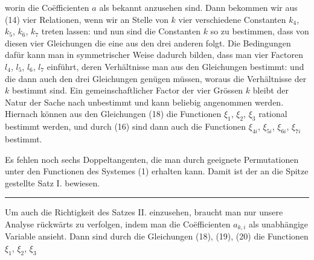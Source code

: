 worin die Co\"efficienten $a$ als bekannt anzusehen sind. Dann bekommen wir aus (14) vier Relationen, wenn wir an Stelle von $k$ vier verschiedene Constanten $k_4$, $k_5$, $k_6$, $k_7$ treten lassen:
und nun sind die Constanten $k$ so zu bestimmen, dass von diesen vier Gleichungen die eine aus den drei anderen folgt. Die Bedingungen dafür kann man in symmetrischer Weise dadurch bilden, dass man vier Factoren $l_4$, $l_5$, $l_6$, $l_7$ einführt, deren Verhältnisse man aus den Gleichungen bestimmt:
und die dann auch den drei Gleichungen
genügen müssen, woraus die Verhältnisse der $k$ bestimmt sind. Ein gemeinschaftlicher Factor der vier Grössen $k$ bleibt der Natur der Sache nach unbestimmt und kann beliebig angenommen werden. Hiernach können aus den Gleichungen (18) die Functionen $\xi_1$, $\xi_2$, $\xi_3$ rational bestimmt werden, und durch (16) sind dann auch die Functionen $\xi_{4i}$, $\xi_{5i}$, $\xi_{6i}$, $\xi_{7i}$ bestimmt.

Es fehlen noch sechs Doppeltangenten, die man durch geeignete Permutationen unter den Functionen des Systemes (1) erhalten kann. Damit ist der an die Spitze gestellte Satz I. bewiesen.

\par\noindent\rule{0.3\textwidth}{0.4pt}\par

Um auch die Richtigkeit des Satzes II. einzusehen, braucht man nur unsere Analyse rückwärts zu verfolgen, indem man die Co\"efficienten $a_{k,i}$ als unabhängige Variable ansieht. Dann sind durch die Gleichungen (18), (19), (20) die Functionen $\xi_1$, $\xi_2$, $\xi_3$
